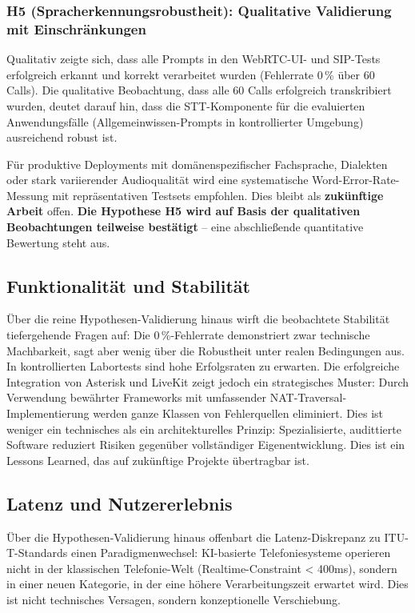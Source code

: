 \subsubsection{H5 (Spracherkennungsrobustheit): Qualitative Validierung mit Einschränkungen}

Qualitativ zeigte sich, dass alle Prompts in den \acrshort{WebRTC}-\acrshort{UI}- und \acrshort{SIP}-Tests erfolgreich erkannt und korrekt verarbeitet wurden (Fehlerrate 0\,\% über 60 Calls). Die qualitative Beobachtung, dass alle 60 Calls erfolgreich transkribiert wurden, deutet darauf hin, dass die \acrshort{STT}-Komponente für die evaluierten Anwendungsfälle (Allgemeinwissen-Prompts in kontrollierter Umgebung) ausreichend robust ist.

Für produktive Deployments mit domänenspezifischer Fachsprache, Dialekten oder stark variierender Audioqualität wird eine systematische Word-Error-Rate-Messung mit repräsentativen Testsets empfohlen. Dies bleibt als \textbf{zukünftige Arbeit} offen. \textbf{Die Hypothese H5 wird auf Basis der qualitativen Beobachtungen teilweise bestätigt} – eine abschließende quantitative Bewertung steht aus.

\subsection{Funktionalität und Stabilität}

Über die reine Hypothesen-Validierung hinaus wirft die beobachtete Stabilität tiefergehende Fragen auf: Die 0\,\%-Fehlerrate demonstriert zwar technische Machbarkeit, sagt aber wenig über die Robustheit unter realen Bedingungen aus. In kontrollierten Labortests sind hohe Erfolgsraten zu erwarten.
Die erfolgreiche Integration von Asterisk und LiveKit zeigt jedoch ein strategisches Muster: Durch Verwendung bewährter Frameworks mit umfassender \acrshort{NAT}-Traversal-Implementierung werden ganze Klassen von Fehlerquellen eliminiert. Dies ist weniger ein technisches als ein architekturelles Prinzip: Spezialisierte, audittierte Software reduziert Risiken gegenüber vollständiger Eigenentwicklung. Dies ist ein Lessons Learned, das auf zukünftige Projekte übertragbar ist.

\subsection{Latenz und Nutzererlebnis}

Über die Hypothesen-Validierung hinaus offenbart die Latenz-Diskrepanz zu \acrshort{ITU-T}-Standards einen Paradigmenwechsel: \acrshort{KI}-basierte Telefoniesysteme operieren nicht in der klassischen Telefonie-Welt (Realtime-Constraint < 400ms), sondern in einer neuen Kategorie, in der eine höhere Verarbeitungszeit erwartet wird. Dies ist nicht technisches Versagen, sondern konzeptionelle Verschiebung.

